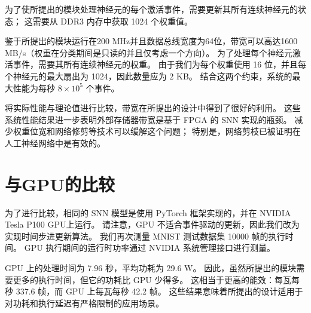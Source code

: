 为了使所提出的模块处理神经元的每个激活事件，需要更新其所有连续神经元的状态； 这需要从 DDR3 内存中获取 1024 个权重值。

鉴于所提出的模块运行在200 MHz并且数据总线宽度为64位，带宽可以高达1600 MB/s（权重在分类期间是只读的并且仅考虑一个方向）。
为了处理每个神经元激活事件，需要其所有连续神经元的权重。
由于我们为每个权重使用 16 位，并且每个神经元的最大扇出为 1024，因此数量应为 2 KB。
结合这两个约束，系统的最大性能为每秒 $8 \times 10^5$ 个事件。

将实际性能与理论值进行比较，带宽在所提出的设计中得到了很好的利用。
这些系统性能结果进一步表明外部存储器带宽是基于 FPGA 的 SNN 实现的瓶颈。
减少权重位宽和网络修剪等技术可以缓解这个问题； 特别是，网络剪枝已被证明在人工神经网络中是有效的。





\section{与GPU的比较}

为了进行比较，相同的 SNN 模型是使用 PyTorch 框架实现的，并在 NVIDIA Tesla P100 GPU上运行。
请注意，GPU 不适合事件驱动的更新，因此我们改为实现时间步进更新算法。 
我们再次测量 MNIST 测试数据集 10000 帧的执行时间。 
GPU 执行期间的运行时功率通过 NVIDIA 系统管理接口进行测量。

GPU 上的处理时间为 7.96 秒，平均功耗为 29.6 W。
因此，虽然所提出的模块需要更多的执行时间，但它的功耗比 GPU 少得多。 
这相当于更高的能效：每瓦每秒 337.6 帧，而 GPU 上每瓦每秒 42.2 帧。 
这些结果意味着所提出的设计适用于对功耗和执行延迟有严格限制的应用场景。
